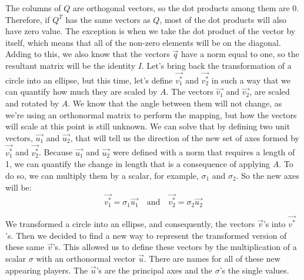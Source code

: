 \documentclass[a4,12pt,twosided,openany]{memoir}
\begin{document}
The columns of $Q$ are orthogonal vectors, so the dot products among them are 0. Therefore, if $Q^T$ has the same vectors as $Q$, most of the dot products will also have zero value. The exception is when we take the dot product of the vector by itself, which means that all of the non-zero elements will be on the diagonal. Adding to this, we also know that the vectors $\overrightarrow{q}$  have a norm equal to one, so the resultant matrix will be the identity $I$. Let’s bring back the transformation of a circle into an ellipse, but this time, let’s define $\overrightarrow{v_1^*}$ and $\overrightarrow{v_2^*}$ in such a way that we can quantify how much they are scaled by $A$. The vectors $\overrightarrow{v_1}$ and $\overrightarrow{v_2}$, are scaled and rotated by $A$. We know that the angle between them will not change, as we’re using an orthonormal matrix to perform the mapping, but how the vectors will scale at this point is still unknown. We can solve that by defining two unit vectors, $\overrightarrow{u_1}$ and $\overrightarrow{u_2}$, that will tell us the direction of the new set of axes formed by $\overrightarrow{v_1^*}$ and $\overrightarrow{v_2^*}$. Because $\overrightarrow{u_1}$ and $\overrightarrow{u_2}$ were defined with a norm that requires a length of 1, we can quantify the change in length that is a consequence of applying $A$. To do so, we can multiply them by a scalar, for example, $\sigma_1$ and $\sigma_2$. So the new axes will be:
\[\overrightarrow{v_1^*} = \sigma_1 \overrightarrow{u_1}  \quad \textrm{and}  \quad \overrightarrow{v_2^*} = \sigma_2 \overrightarrow{u_2}\]
\par 
\indent
We transformed a circle into an ellipse, and consequently, the vectors $\overrightarrow{v}$'s into $\overrightarrow{v^*}$'s. Then we decided to find a new way to represent the transformed version of these same $\overrightarrow{v}$'s. This allowed us to define these vectors by the multiplication of a scalar $\sigma$ with an orthonormal vector $\overrightarrow{u}$. There are names for all of these new appearing players. The $\overrightarrow{u}$'s are the principal axes and the $\sigma$'s the single values.
\end{document}
